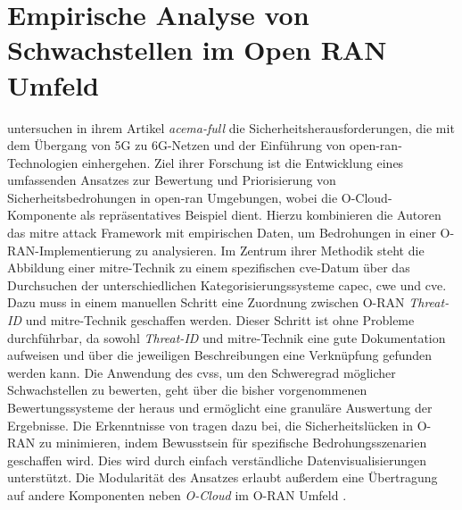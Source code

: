 \section{Empirische Analyse von Schwachstellen im Open RAN Umfeld}
\label{sec:forschungsstand-acema}
\citeauthor{klementSecuring6GTransition2024} untersuchen in ihrem Artikel \textit{\gls{acema-full}} die Sicherheitsherausforderungen, die mit dem Übergang von 5G zu 6G-Netzen und der Einführung von \gls{open-ran}-Technologien einhergehen. Ziel ihrer Forschung ist die Entwicklung eines umfassenden Ansatzes zur Bewertung und Priorisierung von Sicherheitsbedrohungen in \gls{open-ran} Umgebungen, wobei die O-Cloud-Komponente als repräsentatives Beispiel dient. Hierzu kombinieren die Autoren das \gls{mitre} \gls{attack} Framework mit empirischen Daten, um Bedrohungen in einer O-RAN-Implementierung zu analysieren. Im Zentrum ihrer Methodik steht die Abbildung einer \gls{mitre}-Technik zu einem spezifischen \gls{cve}-Datum über das Durchsuchen der unterschiedlichen Kategorisierungssysteme \gls{capec}, \gls{cwe} und \gls{cve}. Dazu muss in einem manuellen Schritt eine Zuordnung zwischen O-RAN \textit{Threat-ID} und \gls{mitre}-Technik geschaffen werden. Dieser Schritt ist ohne Probleme durchführbar, da sowohl \textit{Threat-ID} und \gls{mitre}-Technik eine gute Dokumentation aufweisen und über die jeweiligen Beschreibungen eine Verknüpfung gefunden werden kann. Die Anwendung des \gls{cvss}, um den Schweregrad möglicher Schwachstellen zu bewerten, geht über die bisher vorgenommenen Bewertungssysteme der \orana{} heraus und ermöglicht eine granuläre Auswertung der Ergebnisse. Die Erkenntnisse von \citeauthor{klementSecuring6GTransition2024} tragen dazu bei, die Sicherheitslücken in O-RAN zu minimieren, indem Bewusstsein für spezifische Bedrohungsszenarien geschaffen wird. Dies wird durch einfach verständliche Datenvisualisierungen unterstützt. Die Modularität des Ansatzes erlaubt außerdem eine Übertragung auf andere Komponenten neben \textit{O-Cloud} im O-RAN Umfeld \autocite{klementSecuring6GTransition2024}.

%
